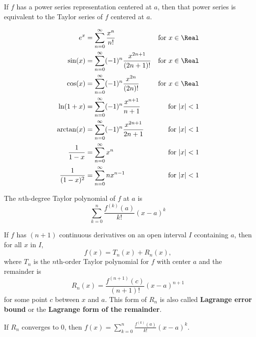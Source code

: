 \begin{theorem}
  If $f$ has a power series representation centered at $a$, then that power series is equivalent to the Taylor series of $f$ centered at $a$.
\end{theorem}

\begin{theorem}
  \begin{align*}
    e^x &= \sum_{n = 0}^\infty \frac{x^n}{n!} & \text{for $x \in \Real$} \\
    \sin(x) &= \sum_{n = 0}^\infty (-1)^n \frac{x^{2n + 1}}{(2n + 1)!} & \text{for $x \in \Real$} \\
    \cos(x) &=\sum_{n = 0}^\infty (-1)^n \frac{x^{2n}}{(2n)!} & \text{for $x \in \Real$} \\
    \ln(1 + x) &= \sum_{n = 0}^\infty (-1)^n \frac{x^{n + 1}}{n + 1} & \text{for $|x| < 1$} \\
    \arctan(x) &= \sum_{n = 0}^\infty (-1)^n \frac{x^{2n + 1}}{2n + 1} & \text{for $|x| < 1$} \\
    \frac{1}{1 - x} &= \sum_{n = 0}^\infty x^n & \text{for $|x| < 1$} \\
    \frac{1}{(1 - x)^2} &= \sum_{n = 0}^\infty nx^{n - 1} & \text{for $|x| < 1$} \\
  \end{align*}
\end{theorem}

\begin{definition} The $n$th-degree Taylor polynomial of $f$ at $a$ is
  \[
    \sum_{k = 0}^n \frac{f^{(k)}(a)}{k!} (x-a)^k
  \]
\end{definition}

\begin{theorem} If $f$ has $(n + 1)$ continuous derivatives on an open interval $I$ ccontaining $a$, then for all $x$ in $I$,
  \[
      f(x) = T_n(x) + R_n(x),
  \]
  where $T_n$ is the $n$th-order Taylor polynomial for $f$ with center $a$ and the remainder is
  \[
      R_n(x) = \frac{f^{(n + 1)}(c)}{(n + 1)!}(x - a)^{n + 1}
  \]
  for some point $c$ between $x$ and $a$. This form of $R_n$ is also called \textbf{Lagrange error bound} or the \textbf{Lagrange form of the remainder}.
\end{theorem}

\begin{theorem} If $R_n$ converges to 0, then $f(x) = \sum_{k = 0}^n \frac{f^{(k)}(a)}{k!} (x-a)^k$.
\end{theorem}

